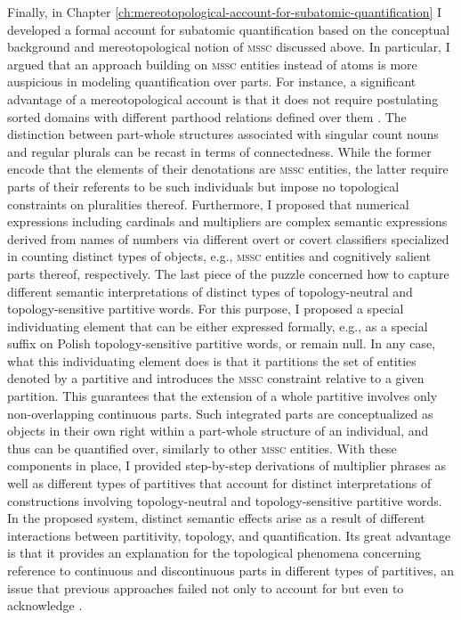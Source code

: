 Finally, in Chapter \ref{ch:mereotopological-account-for-subatomic-quantification} I developed a formal account for subatomic quantification based on the conceptual background and mereo\-topological notion of \textsc{mssc} discussed above. In particular, I argued that an approach building on \textsc{mssc} entities instead of atoms is more auspicious in modeling quantification over parts. For instance, a significant advantage of a mereotopological account is that it does not require postulating sorted domains with different parthood relations defined over them \citep{link1983logical}. The distinction between part-whole structures associated with singular count nouns and regular plurals can be recast in terms of connectedness. While the former encode that the elements of their denotations are \textsc{mssc} entities, the latter require parts of their referents to be such individuals but impose no topological constraints on pluralities thereof. Furthermore, I proposed that numerical expressions including cardinals and multipliers are complex semantic expressions derived from names of numbers via different overt or covert classifiers specialized in counting distinct types of objects, e.g., \textsc{mssc} entities and cognitively salient parts thereof, respectively. The last piece of the puzzle concerned how to capture different semantic interpretations of distinct types of topology-neutral and topology-sensitive partitive words. For this purpose, I proposed a special individuating element that can be either expressed formally, e.g., as a special suffix on Polish topology-sensitive partitive words, or remain null. In any case, what this individuating element does is that it partitions the set of entities denoted by a partitive and introduces the \textsc{mssc} constraint relative to a given partition. This guarantees that the extension of a whole partitive involves only non-overlapping continuous parts. Such integrated parts are conceptualized as objects in their own right within a part-whole structure of an individual, and thus can be quantified over, similarly to other \textsc{mssc} entities. With these components in place, I provided step-by-step derivations of multiplier phrases as well as different types of partitives that account for distinct interpretations of constructions involving topology-neutral and topology-sensitive partitive words. In the proposed system, distinct semantic effects arise as a result of different interactions between partitivity, topology, and quantification. Its great advantage is that it provides an explanation for the topological phenomena concerning reference to continuous and discontinuous parts in different types of partitives, an issue that previous approaches failed not only to account for but even to acknowledge \citep[e.g.,][]{chierchia2010mass}.

